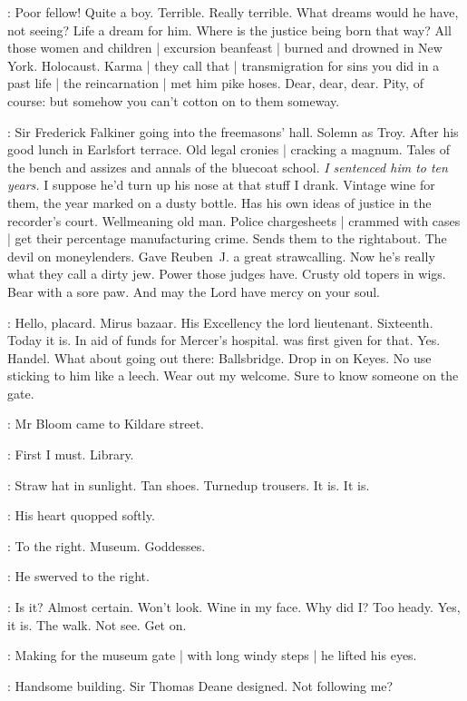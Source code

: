 \BloomInt:
Poor fellow!
Quite a boy.
Terrible.
Really terrible.
What dreams would he have,
not seeing?
Life a dream for him.
Where is the justice being born that way?
All those women and children |
excursion beanfeast |
burned and drowned in New York.
Holocaust.
Karma |
they call that |
transmigration for sins you did in a past life |
the reincarnation |
met him pike hoses.
Dear, dear, dear.
Pity, of course:
but somehow you can't cotton on to them someway.%

\BloomInt:
Sir Frederick Falkiner going into the freemasons' hall.
Solemn as Troy.
After his good lunch in Earlsfort terrace.
Old legal cronies |
cracking a magnum.
Tales of the bench and assizes and annals of the bluecoat school.
\emph{I sentenced him to ten years.}
I suppose he'd turn up his nose at that stuff I drank.
Vintage wine for them,
the year marked on a dusty bottle.
Has his own ideas of justice in the recorder's court.
Wellmeaning old man.
Police chargesheets |
crammed with cases |
get their percentage manufacturing crime.
Sends them to the rightabout.
The devil on moneylenders.
Gave Reuben~J. a great strawcalling.
Now he's really what they call a dirty jew.
Power those judges have.
Crusty old topers in wigs.
Bear with a sore paw.
And may the Lord have mercy on your soul.

\BloomInt:
Hello, placard.
Mirus bazaar.
His Excellency the lord lieutenant.
Sixteenth.
Today it is.
In aid of funds for Mercer's hospital.
 was first given for that.
Yes.
Handel.
What about going out there:
Ballsbridge.
Drop in on Keyes.
No use sticking to him like a leech.
Wear out my welcome.
Sure to know someone on the gate.

:
Mr Bloom came to Kildare street.

\BloomInt:
First I must.
Library.

\BloomInt:
Straw hat in sunlight.
Tan shoes.
Turnedup trousers.
It is.
It is.

:
His heart quopped softly.

\BloomInt:
To the right.
Museum.
Goddesses.

:
He swerved to the right.%

\BloomInt:
Is it?
Almost certain.
Won't look.
Wine in my face.
Why did I?
Too heady.
Yes,
it is.
The walk.
Not see.
Get on.

:
Making for the museum gate |
with long windy steps |
he lifted his eyes.

\BloomInt:
Handsome building.
Sir Thomas Deane designed.
Not following me?

